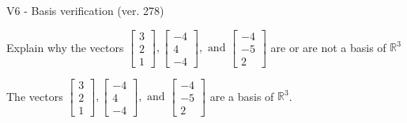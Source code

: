 \begin{exercise}
  \begin{exerciseTitle}V6 - Basis verification (ver. 278)\end{exerciseTitle}
  \begin{exerciseStatement}
    Explain why the vectors \(\left[\begin{array}{r}
3 \\
2 \\
1
\end{array}\right] , \left[\begin{array}{r}
-4 \\
4 \\
-4
\end{array}\right] , \text{ and } \left[\begin{array}{r}
-4 \\
-5 \\
2
\end{array}\right]\) are or are not a basis of \(\mathbb{R}^3\)	


  \end{exerciseStatement}
  \begin{exerciseAnswer}
   The vectors \(\left[\begin{array}{r}
3 \\
2 \\
1
\end{array}\right] , \left[\begin{array}{r}
-4 \\
4 \\
-4
\end{array}\right] , \text{ and } \left[\begin{array}{r}
-4 \\
-5 \\
2
\end{array}\right]\) 
  	 are  a basis of \(\mathbb{R}^3\).
  


  \end{exerciseAnswer}
\end{exercise}